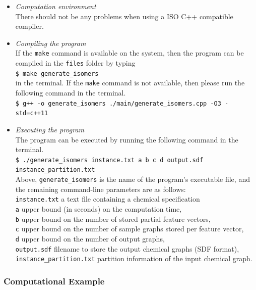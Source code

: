 \documentclass[11pt,titlepage,dvipdfmx,twoside]{book}
\begin{document}
\begin{itemize}
	\item {\em Computation environment}\\
		There should not be any problems when using a ISO C++ compatible compiler. %
	\item {\em Compiling the program}\\
		If the {\tt make} command is available on the system, 
		then the program can be compiled in the {\tt files} folder by typing \\
		\verb|$ make generate_isomers|\\
		in the terminal.
		If the {\tt make} command is not available, then
		please run the following command in the terminal.\\
		\verb|$ g++ -o generate_isomers ./main/generate_isomers.cpp -O3 -std=c++11|\\
	\item {\em Executing the program}\\
		The program can be executed by running the following command in the terminal.\\
		\verb|$ ./generate_isomers instance.txt a b c d output.sdf instance_partition.txt|\\
		Above, {\tt generate\_isomers} is the name of the program's executable file, and the remaining command-line
		parameters are as follows: \\
		\verb|instance.txt|  a text file containing a chemical specification \\
		\verb|a| upper bound (in seconds) on the computation time, \\
		\verb|b| upper bound on the number of stored partial feature vectors, \\
		\verb|c| upper bound on the number of sample graphs stored per feature vector, \\
		\verb|d| upper bound on the number of output graphs, \\
		\verb|output.sdf| filename to store the output chemical graphs (SDF format), \\
		\verb|instance_partition.txt|  partition information of the input chemical graph.
\end{itemize}


\subsubsection{Computational Example}
\label{sec:instance_p}
\end{document}
